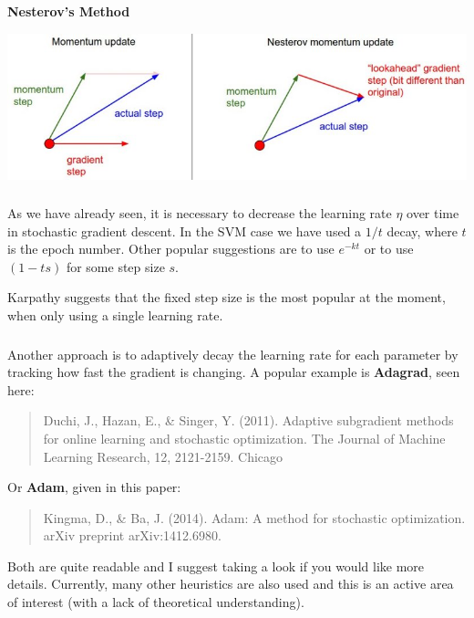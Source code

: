 \documentclass[xetex,mathserif,serif,aspectratio=169]{beamer}
\begin{document}
\begin{frame}[fragile] \frametitle{} \oldB \small

\textbf{Nesterov's Method}

\begin{center}
\includegraphics[width=\textwidth]{img/nesterov.jpeg}
\end{center}

\end{frame}

\begin{frame}[fragile] \frametitle{} \oldB \small

\textbf{}

As we have already seen, it is necessary to decrease the learning
rate $\eta$ over time in stochastic gradient descent. In the SVM
case we have used a $1/t$ decay, where $t$ is the epoch number.
Other popular suggestions are to use $e^{-kt}$ or to use $(1 - ts)$
for some step size $s$.

Karpathy suggests that the fixed step size is the most popular at
the moment, when only using a single learning rate.

\end{frame}

\begin{frame}[fragile] \frametitle{} \oldB \small

\textbf{}

Another approach is to adaptively decay the learning rate for each
parameter by tracking how fast the gradient is changing. A popular
example is \textbf{Adagrad}, seen here:
\begin{quote}
Duchi, J., Hazan, E., \& Singer, Y. (2011). Adaptive subgradient methods for online learning and stochastic optimization. The Journal of Machine Learning Research, 12, 2121-2159.
Chicago
\end{quote}
Or \textbf{Adam}, given in this paper:
\begin{quote}
Kingma, D., \& Ba, J. (2014). Adam: A method for stochastic optimization. arXiv preprint arXiv:1412.6980.
\end{quote}
Both are quite readable and I suggest taking a look if you would like
more details. Currently, many other heuristics are also used and this
is an active area of interest (with a lack of theoretical understanding).

\end{frame}
\end{document}
